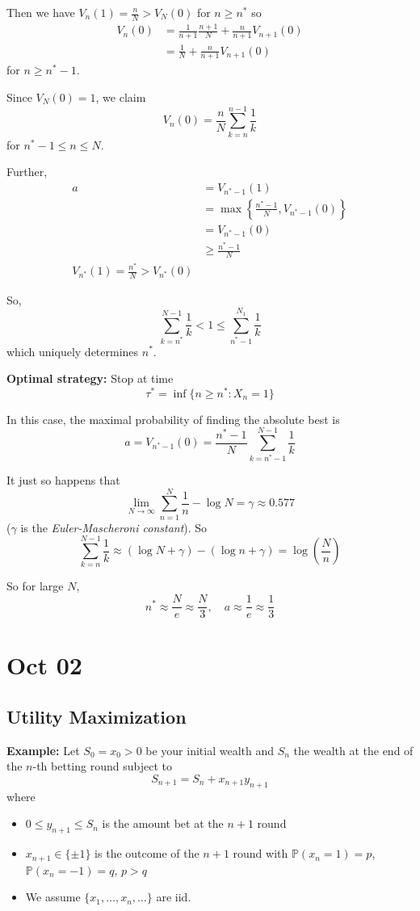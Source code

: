 \documentclass[12pt]{report}
\renewcommand{\P}{\mathbb{P}}
\begin{document}
        Then we have $V_n(1) = \frac{n}{N} > V_N(0)$ for $n \geq n^*$ so 
        \begin{align*}
            V_n(0) &= \frac{1}{n+1} \frac{n+1}{N} + \frac{n}{n+1} V_{n+1}(0)\\ 
                &= \frac{1}{N} + \frac{n}{n+1} V_{n+1}(0)
        \end{align*}
        for $n\geq n^* - 1$. 

        Since $V_N(0) = 1$, we claim
        \[V_n(0) = \frac{n}{N} \sum_{k=n}^{n-1} \frac{1}{k}\]
        for $n^* - 1 \leq n \leq N$. 

        Further, 
        \begin{align*}
            a &= V_{n^* - 1}(1)\\ 
                &= \max\left\{\frac{n^* - 1}{N}, V_{n^* - 1}(0)\right\}\\ 
                &= V_{n^* - 1}(0)\\ 
                &\geq \frac{n^* - 1}{N}\\ 
            V_{n^*}(1) = \frac{n^*}{N} > V_{n^*}(0)
        \end{align*}

        So, 
        \[\sum_{k=n^*}^{N-1} \frac{1}{k} < 1 \leq \sum_{n^*-1}^{N_1} \frac{1}{k}\]
        which uniquely determines $n^*$.

        \textbf{Optimal strategy:} Stop at time 
        \[\tau^* = \inf\{n \geq n^*: X_n = 1\}\]

        In this case, the maximal probability of finding the absolute best is 
        \[a = V_{n^* - 1}(0) = \frac{n^* - 1}{N} \sum_{k=n^*-1}^{N-1} \frac{1}{k}\]

        It just so happens that 
        \[\lim_{N \to \infty} \sum_{n=1}^{N}\frac{1}{n} - \log N = \gamma \approx 0.577 \]
        ($\gamma$ is the \emph{Euler-Mascheroni constant}). So 
        \[\sum_{k=n}^{N-1} \frac{1}{k} \approx (\log N + \gamma) - (\log n + \gamma) = \log\left(\frac{N}{n}\right) \]

        So for large $N$, 
        \[n^* \approx \frac{N}{e} \approx \frac{N}{3}, \quad a \approx \frac{1}{e} \approx \frac{1}{3}\]

\section{Oct 02}
    \subsection*{Utility Maximization} 
        \textbf{Example:} Let $S_0 = x_0 > 0$ be your initial wealth and $S_n$ the wealth at the end of the $n$-th betting round subject to 
        \[S_{n+1} = S_n + x_{n+1} y_{n+1}\]
        where 
        \begin{itemize}
            \item $0 \leq y_{n+1} \leq S_n$ is the amount bet at the $n+1$ round
            \item $x_{n+1} \in \{\pm 1\}$ is the outcome of the $n+1$ round with $\P(x_{n} = 1) = p$, $\P(x_{n} = -1) = q$, $p > q$
            \item We assume $\{x_1, \dots, x_n, \dots\}$ are iid. 
        \end{itemize}
\end{document}
